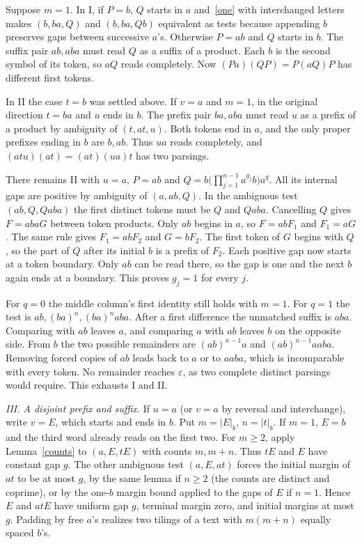 \documentclass[11pt,a4paper]{article}
\newcommand{\eps}{\varepsilon}
\newcommand{\bct}[1]{\lvert #1\rvert_b}
\newcommand{\parhead}[1]{\par\smallskip\noindent\textit{#1.}\enspace}
\begin{document}
Suppose $m=1$. In I, if $P=b$, $Q$ starts in $a$ and~\eqref{one} with interchanged letters makes $(b,ba,Q)$ and $(b,ba,Qb)$ equivalent as tests because appending $b$ preserves gaps between successive $a$'s. Otherwise $P=ab$ and $Q$ starts in $b$. The suffix pair $ab,aba$ must read $Q$ as a suffix of a product. Each $b$ is the second symbol of its token, so $aQ$ reads completely. Now $(Pa)(QP)=P(aQ)P$ has different first tokens.

In II the case $t=b$ was settled above. If $v=a$ and $m=1$, in the original direction $t=ba$ and $u$ ends in $b$. The prefix pair $ba,aba$ must read $u$ as a prefix of a product by ambiguity of $(t,at,u)$. Both tokens end in $a$, and the only proper prefixes ending in $b$ are $b,ab$. Thus $ua$ reads completely, and $(atu)(at)=(at)(ua)t$ has two parsings.

There remains II with $u=a$, $P=ab$ and $Q=b\bigl(\prod_{j=1}^{n-1} a^{g_j}b\bigr)a^q$. All its internal gaps are positive by ambiguity of $(a,ab,Q)$. In the ambiguous test $(ab,Q,Qaba)$ the first distinct tokens must be $Q$ and $Qaba$. Cancelling $Q$ gives $F=abaG$ between token products. Only $ab$ begins in $a$, so $F=abF_1$ and $F_1=aG$. The same rule gives $F_1=abF_2$ and $G=bF_2$. The first token of $G$ begins with $Q$, so the part of $Q$ after its initial $b$ is a prefix of $F_2$. Each positive gap now starts at a token boundary. Only $ab$ can be read there, so the gap is one and the next $b$ again ends at a boundary. This proves $g_j=1$ for every $j$.

For $q=0$ the middle column's first identity still holds with $m=1$. For $q=1$ the test is $ab,(ba)^n,(ba)^n aba$. After a first difference the unmatched suffix is $aba$. Comparing with $ab$ leaves $a$, and comparing $a$ with $ab$ leaves $b$ on the opposite side. From $b$ the two possible remainders are $(ab)^{n-1}a$ and $(ab)^{n-1}aaba$. Removing forced copies of $ab$ leads back to $a$ or to $aaba$, which is incomparable with every token. No remainder reaches $\eps$, as two complete distinct parsings would require. This exhausts I and II.
\parhead{III. A disjoint prefix and suffix}
If $u=a$ (or $v=a$ by reversal and interchange), write $v=E$, which starts and ends in $b$. Put $m=\bct E$, $n=\bct t$. If $m=1$, $E=b$ and the third word already reads on the first two. For $m\ge2$, apply Lemma~\ref{counts} to $(a,E,tE)$ with counts $m,m+n$. Thus $tE$ and $E$ have constant gap $g$. The other ambiguous test $(a,E,at)$ forces the initial margin of $at$ to be at most $g$, by the same lemma if $n\ge2$ (the counts are distinct and coprime), or by the one-$b$ margin bound applied to the gaps of $E$ if $n=1$. Hence $E$ and $atE$ have uniform gap $g$, terminal margin zero, and initial margins at most $g$. Padding by free $a$'s realizes two tilings of a text with $m(m+n)$ equally spaced $b$'s.
\end{document}
